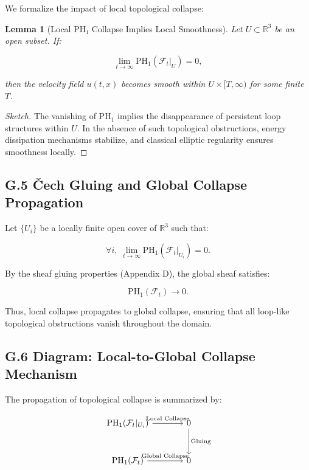 \documentclass[11pt]{article}
\newtheorem{lemma}[theorem]{Lemma}
\begin{document}
We formalize the impact of local topological collapse:

\begin{lemma}[Local PH₁ Collapse Implies Local Smoothness]
Let \( U \subset \mathbb{R}^3 \) be an open subset.  
If:

\[
\lim_{t \to \infty} \mathrm{PH}_1(\mathcal{F}_t|_U) = 0,
\]

then the velocity field \( u(t, x) \) becomes smooth within \( U \times [T, \infty) \) for some finite \( T \).
\end{lemma}

\begin{proof}[Sketch]
The vanishing of \( \mathrm{PH}_1 \) implies the disappearance of persistent loop structures within \( U \).  
In the absence of such topological obstructions, energy dissipation mechanisms stabilize, and classical elliptic regularity ensures smoothness locally.
\end{proof}

\subsection*{G.5 Čech Gluing and Global Collapse Propagation}

Let \( \{ U_i \} \) be a locally finite open cover of \( \mathbb{R}^3 \) such that:

\[
\forall i,\; \lim_{t \to \infty} \mathrm{PH}_1(\mathcal{F}_t|_{U_i}) = 0.
\]

By the sheaf gluing properties (Appendix D), the global sheaf satisfies:

\[
\mathrm{PH}_1(\mathcal{F}_t) \to 0.
\]

Thus, local collapse propagates to global collapse, ensuring that all loop-like topological obstructions vanish throughout the domain.

\subsection*{G.6 Diagram: Local-to-Global Collapse Mechanism}

The propagation of topological collapse is summarized by:

\[
\begin{tikzcd}[row sep=large, column sep=large]
\mathrm{PH}_1(\mathcal{F}_t|_{U_i})
  \arrow[r, "\text{Local Collapse}"]
& 0
  \arrow[d, "\text{Gluing}"] \\
\mathrm{PH}_1(\mathcal{F}_t)
  \arrow[r, "\text{Global Collapse}"]
& 0
\end{tikzcd}
\]
\end{document}
